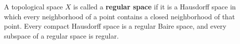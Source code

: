 A topological space $X$ is called a \textbf{regular space} if it is a Hausdorff space in which every neighborhood of a point contains a closed neighborhood of that point. Every compact Hausdorff space is a regular Baire space, and every subspace of a regular space is regular.
